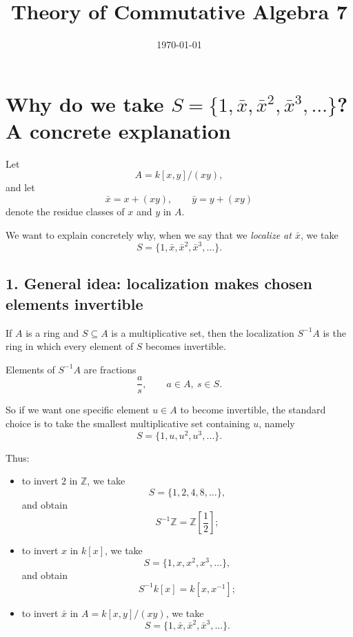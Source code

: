 \documentclass[12pt,a4paper]{article}
\title{\vspace{-1.5em}\bfseries Theory of Commutative Algebra 7}
\author{}
\date{\today}
\theoremstyle{notespace}
\begin{document}
	\maketitle
	\thispagestyle{fancy}
	
		\tableofcontents
	\clearpage
	
\section{Why do we take \(S=\{1,\bar x,\bar x^{2},\bar x^{3},\dots\}\)? A concrete explanation}

Let
\[
A = k[x,y]/(xy),
\]
and let
\[
\bar x = x+(xy), \qquad \bar y = y+(xy)
\]
denote the residue classes of \(x\) and \(y\) in \(A\).

We want to explain concretely why, when we say that we \emph{localize at \(\bar x\)}, we take
\[
S=\{1,\bar x,\bar x^2,\bar x^3,\dots\}.
\]

\subsection{1. General idea: localization makes chosen elements invertible}

If \(A\) is a ring and \(S\subseteq A\) is a multiplicative set, then the localization \(S^{-1}A\) is the ring in which every element of \(S\) becomes invertible.

Elements of \(S^{-1}A\) are fractions
\[
\frac{a}{s}, \qquad a\in A,\ s\in S.
\]

So if we want one specific element \(u\in A\) to become invertible, the standard choice is to take the smallest multiplicative set containing \(u\), namely
\[
S=\{1,u,u^2,u^3,\dots\}.
\]

Thus:

\begin{itemize}
	\item to invert \(2\) in \(\mathbb Z\), we take
	\[
	S=\{1,2,4,8,\dots\},
	\]
	and obtain
	\[
	S^{-1}\mathbb Z=\mathbb Z\!\left[\frac12\right];
	\]
	
	\item to invert \(x\) in \(k[x]\), we take
	\[
	S=\{1,x,x^2,x^3,\dots\},
	\]
	and obtain
	\[
	S^{-1}k[x]=k[x,x^{-1}];
	\]
	
	\item to invert \(\bar x\) in \(A=k[x,y]/(xy)\), we take
	\[
	S=\{1,\bar x,\bar x^2,\bar x^3,\dots\}.
	\]
\end{itemize}
\end{document}
